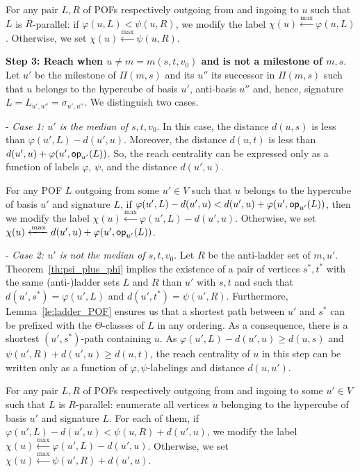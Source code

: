\documentclass{article}
\newcommand{\opp}{\mbox{\textsf{op}}}
\begin{document}
For any pair $L,R$ of POFs respectively outgoing from and ingoing to $u$ such that $L$ is $R$-parallel: if $\varphi(u,L) < \psi(u,R)$, we modify the label $\chi(u) \xleftarrow{\max} \varphi(u,L)$. Otherwise, we set $\chi(u) \xleftarrow{\max} \psi(u,R)$.

\textbf{Step 3: Reach when $u\neq m=m(s,t,v_0)$ and is not a milestone of $m,s$}. Let $u'$ be the milestone of $\Pi(m,s)$ and its $u''$ its successor in $\Pi(m,s)$ such that $u$ belongs to the hypercube of basis $u'$, anti-basis $u''$ and, hence, signature $L = L_{u',u''} = \sigma_{u',u''}$. We distinguish two cases.

- \textit{Case 1: $u'$ is the median of $s,t,v_0$}. In this case, the distance $d(u,s)$ is less than $\varphi(u',L)-d(u',u)$. Moreover, the distance $d(u,t)$ is less than $d(u',u)+\varphi(u',\opp_{u'}(L))$. So, the  reach centrality can be expressed only as a function of labels $\varphi$, $\psi$, and the distance $d(u',u)$.

For any POF $L$ outgoing from some $u' \in V$ such that $u$ belongs to the hypercube of basis $u'$ and signature $L$, if $\varphi(u',L)-d(u',u) < d(u',u)+\varphi(u',\opp_{u'}(L))$, then we modify the label $\chi(u) \xleftarrow{\max} \varphi(u',L)-d(u',u)$. Otherwise, we set $\chi(u) \xleftarrow{\max} d(u',u)+\varphi(u',\opp_{u'}(L))$.

- \textit{Case 2: $u'$ is not the median of $s,t,v_0$}. Let $R$ be the anti-ladder set of $m,u'$. Theorem~\ref{th:psi_plus_phi} implies the existence of a pair of vertices $s^*,t^*$ with the same (anti-)ladder sets $L$ and $R$ than $u'$ with $s,t$ and such that $d(u',s^*) = \varphi(u',L)$ and $d(u',t^*) = \psi(u',R)$. Furthermore, Lemma~\ref{le:ladder_POF} ensures us that a shortest path between $u'$ and $s^*$ can be prefixed with the $\Theta$-classes of $L$ in any ordering. As a consequence, there is a shortest $(u',s^*)$-path containing $u$. As $\varphi(u',L)-d(u',u) \ge d(u,s)$ and $\psi(u',R) + d(u',u) \ge d(u,t)$, the  reach centrality of $u$ in this step can be written only as a function of  $\varphi,\psi$-labelings and distance $d(u,u')$.

For any pair $L,R$ of POFs respectively outgoing from and ingoing to some $u' \in V$ such that $L$ is $R$-parallel: enumerate all vertices $u$ belonging to the hypercube of basis $u'$ and signature $L$. For each of them, if $\varphi(u',L)-d(u',u) < \psi(u,R)+d(u',u)$, we modify the label $\chi(u) \xleftarrow{\max} \varphi(u',L)-d(u',u)$. Otherwise, we set $\chi(u) \xleftarrow{\max} \psi(u',R)+d(u',u)$.
\end{document}
